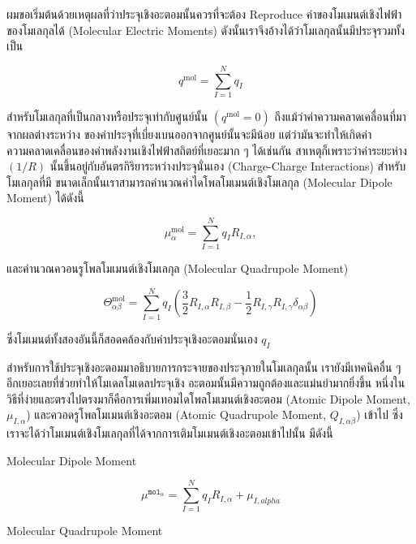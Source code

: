 ผมขอเริ่มต้นด้วยเหตุผลที่ว่าประจุเชิงอะตอมนั้นควรที่จะต้อง Reproduce ค่าของโมเมนต์เชิงไฟฟ้าของโมเลกุลได้ (Molecular Electric Moments)
ดังนั้นเราจึงอ้างได้ว่าโมเลกุลนั้นมีประจุรวมทั้งเป็น

\begin{equation}
  q^{\mathrm{mol}}
  =
  \sum_{I=1}^N q_I
\end{equation}

\noindent สำหรับโมเลกุลที่เป็นกลางหรือประจุเท่ากับศูนย์นั้น $(q^{\mathrm{mol}} = 0)$ ถึงแม้ว่าค่าความคลาดเคลื่อนที่มาจากผลต่างระหว่าง%
ของค่าประจุที่เบี่ยงเบนออกจากศูนย์นั้นจะมีน้อย แต่ว่ามันจะทำให้เกิดค่าความคลาดเคลื่อนของค่าพลังงานเชิงไฟฟ้าสถิตย์ที่เยอะมาก ๆ ได้เช่นกัน
สาเหตุก็เพราะว่าค่าระยะห่าง $(1 / R)$ นั้นขึ้นอยู่กับอันตรกิริยาระหว่างประจุนั่นเอง (Charge-Charge Interactions) สำหรับโมเลกุลที่มี%
ขนาดเล็กนั้นเราสามารถคำนวณค่าไดโพลโมเมนต์เชิงโมเลกุล (Molecular Dipole Moment) ได้ดังนี้

\begin{equation}
  \mu_\alpha^{\mathrm{mol}}
  =
  \sum_{I=1}^N q_I R_{I, \alpha},
\end{equation}

\noindent และคำนวณควอนรูโพลโมเมนต์เชิงโมเลกุล (Molecular Quadrupole Moment)

\begin{equation}
  \Theta_{\alpha \beta}^{\mathrm{mol}}
  =
  \sum_{I=1}^N q_I
  \left(
  \frac{3}{2} R_{I, \alpha} R_{I, \beta}
  -\frac{1}{2} R_{I, \gamma} R_{I, \gamma} \delta_{\alpha \beta}
  \right)
\end{equation}

\noindent ซึ่งโมเมนต์ทั้งสองอันนี้ก็สอดคล้องกับค่าประจุเชิงอะตอมนั่นเอง $q_I$

สำหรับการใช้ประจุเชิงอะตอมมาอธิบายการกระจายของประจุภายในโมเลกุลนั้น เรายังมีเทคนิคอื่น ๆ อีกเยอะเลยที่ช่วยทำให้โมเดลโมเดลประจุเชิง%
อะตอมนั้นมีความถูกต้องและแม่นยำมากยิ่งขึ้น หนึ่งในวิธีที่ง่ายและตรงไปตรงมาก็คือการเพิ่มเทอมไดโพลโมเมนต์เชิงอะตอม (Atomic Dipole 
Moment, $\mu_{I,\alpha}$) และควอดรูโพลโมเมนต์เชิงอะตอม (Atomic Quadrupole Moment, $Q_{I,\alpha \beta}$) เข้าไป 
ซึ่งเราจะได้ว่าโมเมนต์เชิงโมเลกุลที่ได้จากการเติมโมเมนต์เชิงอะตอมเข้าไปนั้น มีดังนี้

\noindent Molecular Dipole Moment

\begin{equation}
  \label{eq:mol_moment_mu}
  \mu^{\texttt{mol}_{\alpha}}
  =
  \sum^{N}_{I=1} q_{I} R_{I,\alpha} + \mu_{I,alpha}
\end{equation}

\noindent Molecular Quadrupole Moment

